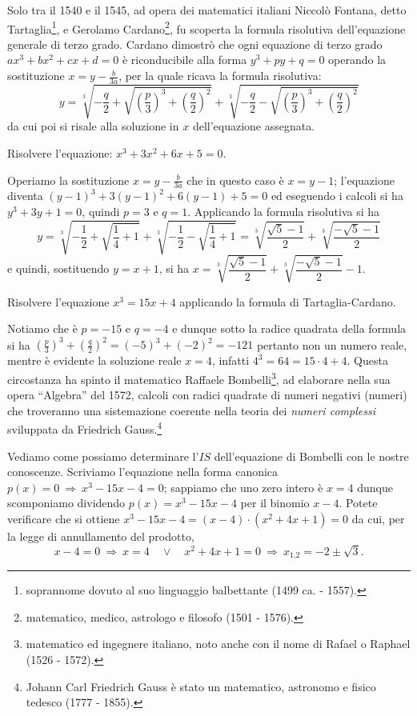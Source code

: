 Solo tra il 1540 e il 1545, ad opera dei matematici italiani Niccolò Fontana, detto Tartaglia\footnote{soprannome dovuto al suo linguaggio balbettante (1499 ca. - 1557).}, e Gerolamo Cardano\footnote{matematico, medico, astrologo e filosofo (1501 - 1576).}, fu scoperta la formula risolutiva dell'equazione generale di terzo grado.
Cardano dimostrò che ogni equazione di terzo grado $ax^3+bx^2+cx+d=0$ è riconducibile alla forma $y^3+py+q=0$ operando la sostituzione $x=y-\frac b{3a}$, per la quale ricava la formula risolutiva: 
\[y=\sqrt[3]{-\frac q 2+\sqrt{\left(\frac p 3\right)^3+\left(\frac q 2\right)^2}}+\sqrt[3]{-\frac q 2-\sqrt{\left(\frac p 3\right)^3+\left(\frac q 2\right)^2}}\] 
da cui poi si risale alla soluzione in $x$ dell'equazione assegnata.
\begin{exrig}
\begin{esempio}
Risolvere l'equazione: $x^3+3x^2+6x+5=0$.

Operiamo la sostituzione $x=y-\frac b{3a}$ che in questo caso è $x=y-1$; l'equazione diventa $(y-1)^3+3(y-1)^2+6(y-1)+5=0$ ed eseguendo i calcoli si ha $y^3+3y+1=0$, quindi $p=3$ e $q=1$.
Applicando la formula risolutiva si ha 
\[y=\sqrt[3]{-\frac 1 2+\sqrt{\frac 1 4+1}}+\sqrt[3]{-\frac 1 2-\sqrt{\frac 1 4+1}}=\sqrt[3]{\frac{\sqrt 5-1} 2}+\sqrt[3]{\frac{-\sqrt 5-1} 2}\] 
e quindi, sostituendo $y=x+1$, si ha $x=\sqrt[3]{\dfrac{\sqrt 5-1} 2}+\sqrt[3]{\dfrac{-\sqrt 5-1} 2}-1$.
\end{esempio}

\begin{esempio}
Risolvere l'equazione $x^3=15x+4$ applicando la formula di Tartaglia-Cardano.

Notiamo che è $p=-15$ e $q=-4$ e dunque sotto la radice quadrata della formula 
si ha $\left(\frac p 3\right)^3+\left(\frac q 2\right)^2=(-5)^3+(-2)^2=-121$ pertanto non un numero
reale, mentre è evidente la soluzione reale $x=4$, infatti $4^3=64=15\cdot 4+4$. Questa circostanza ha spinto il matematico Raffaele Bombelli\footnote{matematico ed ingegnere italiano, noto anche con il nome di Rafael o Raphael (1526 - 1572).}, ad elaborare nella sua opera ``Algebra'' del 1572, calcoli con radici quadrate di numeri negativi (numeri) che troveranno una sistemazione coerente nella teoria dei \emph{numeri complessi} sviluppata da Friedrich Gauss.\footnote{Johann Carl Friedrich Gauss è stato un matematico, astronomo e fisico tedesco (1777 - 1855).}

Vediamo come possiamo determinare l'$IS$ dell'equazione di Bombelli con le nostre conoscenze. Scriviamo l'equazione nella forma canonica $p(x)=0\:\Rightarrow\: x^3-15x-4=0$; sappiamo che uno zero intero è $x=4$ dunque scomponiamo dividendo $p(x)=x^3-15x-4$ per il binomio $x-4$. Potete verificare che si ottiene $x^3-15x-4=(x-4)\cdot (x^2+4x+1)=0$ da cui, per la legge di annullamento del prodotto, 
\[x-4=0\:\Rightarrow\: x=4\quad\vee\quad x^2+4x+1=0\:\Rightarrow\: x_{1\text{,}2}=-2\pm \sqrt 3.\]


\end{esempio}
\end{exrig}
